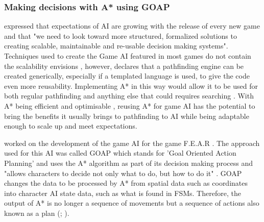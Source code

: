 \documentclass[11pt, a4paper]{article}
\begin{document}
\subsubsection{Making decisions with A* using GOAP}

\citeauthor{orkin2003applying} \parencite*[11]{orkin2003applying} expressed that expectations of AI are growing with the release of every new game and that "we need to look toward more structured, formalized solutions to creating scalable, maintainable and re-usable decision making systems". Techniques used to create the Game AI featured in most games do not contain the scalability \citeauthor{orkin2003applying} envisions \parencite[17]{laird2001human}, however, \citeauthor{higgins2002generic} \parencite*[117]{higgins2002generic} declares that a pathfinding engine can be created generically, especially if a templated language is used, to give the code even more reusability. Implementing A* in this way would allow it to be used for both regular pathfinding and anything else that could requires searching \parencite[120]{higgins2002generic}. With A* being efficient and optimisable \parencite[215]{millington2019ai}, reusing A* for game AI has the potential to bring the benefits it usually brings to pathfinding to AI while being adaptable enough to scale up and meet expectations.

\citeauthor{orkin2006three} \parencite*[1]{orkin2006three} worked on the development of the game AI for the game F.E.A.R \parencite{FEAR}. The approach used for this AI was called GOAP which stands for 'Goal Oriented Action Planning' and uses the A* algorithm as part of its decision making process and "allows characters to decide not only what to do, but how to do it" \parencite[1]{orkin2003applying}. GOAP changes the data to be processed by A* from spatial data such as coordinates into character AI state data, such as what is found in FSMs. Therefore, the output of A* is no longer a sequence of movements but a sequence of actions also known as a plan (\cite[2]{orkin2003applying}; \cite[6]{tozour2002evolution}).
\end{document}
